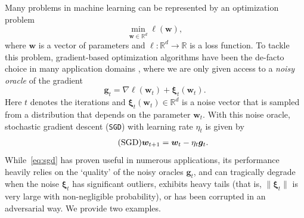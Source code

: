 \documentclass[10pt]{article} %
\renewcommand{\vec}[1]{\bm{#1}}
\newcommand{\bw}{\bm{w}}
\newcommand{\bg}{\bm{g}}
\newcommand{\R}{\mathbb{R}}
\newcommand{\SGD}{\texttt{SGD}}
\begin{document}
Many problems in machine learning can be represented by an optimization problem
\begin{equation*} \label{eq:prob}
 \min_{\bw\in \R^d} \ell(\bw),
\end{equation*} 
where $\vec{w}$ is a vector of parameters and $\ell :\mathbb{R}^d \to \mathbb{R}$ is a loss function. 
To tackle this problem, gradient-based optimization algorithms have been the de-facto choice in many application domains \citep{Nemirovsky1983,Bottou2010,Bottou2018}, where we are only given access to a \emph{noisy oracle} of the  gradient %
\begin{equation}\label{eqn:noisy-oracle}
\vec{g}_t = \nabla \ell(\vec{w}_t) + \vec{\xi}_t(\vec{w}_t). 
\end{equation}
Here $t$ denotes the iterations and $\vec{\xi}_t(\vec{w}_t) \in \R^d $ is a noise vector that is sampled from a distribution that depends on the parameter $\vec{w}_t$.
% 
With this noise oracle, stochastic gradient descent (\SGD) with learning rate $\eta_t$ is given by 
\begin{align}\tag{\SGD} \label{eq:sgd}
\bw_{t+1} = \bw_t - \eta_t \bg_t.
\end{align}
While~\ref{eq:sgd} has proven useful in numerous applications, its  performance  heavily relies on the `quality' of the noisy oracles $\vec{g}_t$, and can tragically degrade when the noise $\vec{\xi}_t$ has significant outliers, exhibits heavy tails (that is, $\|\vec{\xi}_t\|$ is very large with non-negligible probability), or has been corrupted in an adversarial way. We provide two examples.
\end{document}
